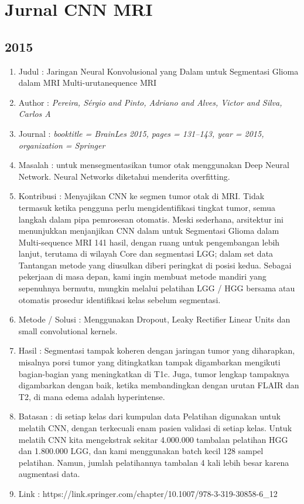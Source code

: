 \section{Jurnal CNN MRI}
\subsection{2015}
\begin{enumerate}
  \item Judul : Jaringan Neural Konvolusional yang Dalam untuk Segmentasi Glioma dalam MRI Multi-urutanequence MRI
  \item Author : \textit{Pereira, S{\'e}rgio and Pinto, Adriano and Alves, Victor and Silva, Carlos A}
  \item Journal : \textit{booktitle = BrainLes 2015, pages = 131--143, year = 2015, organization = Springer}
  \item Masalah : untuk mensegmentasikan tumor otak menggunakan Deep Neural Network. Neural Networks diketahui menderita overfitting.
  \item Kontribusi : Menyajikan CNN ke segmen tumor otak di MRI. Tidak termasuk ketika pengguna perlu mengidentifikasi tingkat tumor, semua langkah dalam pipa pemrosesan otomatis. Meski sederhana, arsitektur ini menunjukkan menjanjikan
CNN dalam untuk Segmentasi Glioma dalam Multi-sequence MRI 141
hasil, dengan ruang untuk pengembangan lebih lanjut, terutama di wilayah Core dan
segmentasi LGG; dalam set data Tantangan metode yang diusulkan diberi peringkat
di posisi kedua. Sebagai pekerjaan di masa depan, kami ingin membuat metode mandiri yang sepenuhnya bermutu, mungkin melalui pelatihan LGG / HGG bersama atau otomatis
prosedur identifikasi kelas sebelum segmentasi.

  \item Metode / Solusi : Menggunakan Dropout, Leaky Rectifier Linear Units dan small convolutional kernels.
  \item Hasil : Segmentasi tampak koheren dengan jaringan tumor yang diharapkan, misalnya
porsi tumor yang ditingkatkan tampak digambarkan mengikuti bagian-bagian yang meningkatkan di
T1c. Juga, tumor lengkap tampaknya digambarkan dengan baik, ketika membandingkan
dengan urutan FLAIR dan T2, di mana edema adalah hyperintense.
  \item Batasan : di setiap kelas dari kumpulan data Pelatihan digunakan untuk melatih CNN, dengan
terkecuali enam pasien validasi di setiap kelas. Untuk melatih CNN kita
mengekstrak sekitar 4.000.000 tambalan pelatihan HGG dan 1.800.000 LGG, dan
kami menggunakan batch kecil 128 sampel pelatihan. Namun, jumlah pelatihannya
tambalan 4 kali lebih besar karena augmentasi data.
  \item Link : https://link.springer.com/chapter/10.1007/978-3-319-30858-6_12
\end{enumerate} 